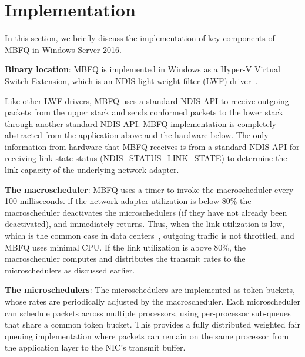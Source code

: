 \section{Implementation}
\label{sec:implementation}
In this section, we briefly discuss the implementation of key components of MBFQ in Windows
Server 2016.

{\bf Binary location}: MBFQ is implemented in Windows as a Hyper-V Virtual
Switch Extension, which is an NDIS light-weight filter (LWF) driver~\cite{fd}.

Like other LWF drivers, MBFQ uses a standard NDIS API to receive outgoing
packets from the upper stack and sends conformed packets to the lower stack
through another standard NDIS API.  MBFQ implementation is completely abstracted
from the application above and the hardware below.  The only information from
hardware that MBFQ receives is from a standard NDIS API for receiving link state
status (NDIS\_STATUS\_LINK\_STATE) to determine the link capacity of the underlying 
network adapter.

{\bf The macroscheduler}: MBFQ uses a timer to invoke the macroscheduler every
100 milliseconds. if the network adapter utilization is below 80\% the
macroscheduler deactivates the microschedulers (if they have not already been
deactivated), and immediately returns.  Thus, when the link utilization is low,
which is the common case in data centers~\cite{fb,kandula09}, outgoing traffic
is not throttled, and MBFQ uses minimal CPU.  If the link utilization is above
80\%, the macroscheduler computes and distributes the transmit rates to the
microschedulers as discussed earlier.

{\bf The microschedulers}: The microschedulers are implemented as token buckets,
whose rates are periodically adjusted by the macroscheduler.  Each
microscheduler can schedule packets across multiple processors, using
per-processor sub-queues that share a common token bucket.  This provides a
fully distributed weighted fair queuing implementation where packets can remain
on the same processor from the application layer to the NIC's transmit buffer.


